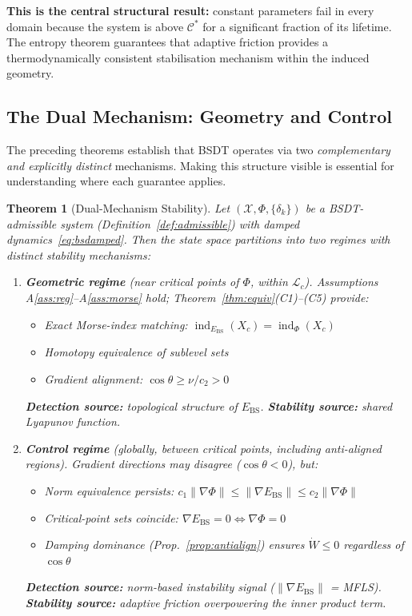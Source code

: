 \documentclass[11pt,a4paper]{article}
\newcommand{\Ebs}{E_{\mathrm{BS}}}
\newcommand{\Cman}{\mathcal{C}^*}
\newcommand{\grad}{\nabla}
\DeclareMathOperator{\ind}{ind}
\newtheorem{theorem}{Theorem}
\begin{document}
\noindent
\textbf{This is the central structural result:} constant
parameters fail in every domain because the system is above $\Cman$
for a significant fraction of its lifetime.  The entropy theorem
guarantees that adaptive friction provides a thermodynamically
consistent stabilisation mechanism within the induced geometry.

\subsection{The Dual Mechanism: Geometry and Control}\label{sec:dual}

The preceding theorems establish that BSDT operates via two
\emph{complementary and explicitly distinct} mechanisms.
Making this structure visible is essential for understanding
where each guarantee applies.

\begin{theorem}[Dual-Mechanism Stability]\label{thm:dual}
Let $(\mathcal{X}, \Phi, \{\delta_k\})$ be a BSDT-admissible system
(Definition~\ref{def:admissible}) with damped dynamics~\eqref{eq:bsdamped}.
Then the state space partitions into two regimes with distinct
stability mechanisms:

\begin{enumerate}[nosep]
  \item[\textup{(D1)}] \textbf{Geometric regime}  (near critical
    points of $\Phi$, within $\mathcal{L}_c$).
    Assumptions A\ref{ass:reg}--A\ref{ass:morse} hold;
    Theorem~\ref{thm:equiv}(C1)--(C5) provide:
    \begin{itemize}[nosep]
      \item Exact Morse-index matching: $\ind_{\Ebs}(X_c) = \ind_\Phi(X_c)$
      \item Homotopy equivalence of sublevel sets
      \item Gradient alignment: $\cos\theta \ge \nu/c_2 > 0$
    \end{itemize}
    \textbf{Detection source:} topological structure of $\Ebs$.
    \textbf{Stability source:} shared Lyapunov function.

  \item[\textup{(D2)}] \textbf{Control regime}  (globally,
    between critical points, including anti-aligned regions).
    Gradient directions may disagree ($\cos\theta < 0$), but:
    \begin{itemize}[nosep]
      \item Norm equivalence persists:
        $c_1\|\grad\Phi\| \le \|\grad\Ebs\| \le c_2\|\grad\Phi\|$
      \item Critical-point sets coincide:
        $\grad\Ebs = 0 \iff \grad\Phi = 0$
      \item Damping dominance (Prop.~\ref{prop:antialign}) ensures
        $\dot{W} \le 0$ regardless of $\cos\theta$
    \end{itemize}
    \textbf{Detection source:} norm-based instability signal
    ($\|\grad\Ebs\|$ = MFLS).
    \textbf{Stability source:} adaptive friction overpowering
    the inner product term.
\end{enumerate}
\end{theorem}
\end{document}
